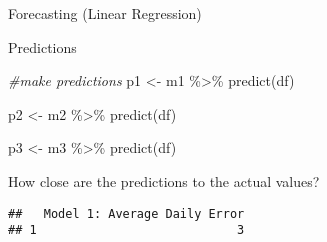 \documentclass[
  ignorenonframetext,
]{beamer}
\newenvironment{Shaded}{\begin{snugshade}}{\end{snugshade}}
\newcommand{\AttributeTok}[1]{\textcolor[rgb]{0.77,0.63,0.00}{#1}}
\newcommand{\CommentTok}[1]{\textcolor[rgb]{0.56,0.35,0.01}{\textit{#1}}}
\newcommand{\FunctionTok}[1]{\textcolor[rgb]{0.00,0.00,0.00}{#1}}
\newcommand{\NormalTok}[1]{#1}
\newcommand{\OtherTok}[1]{\textcolor[rgb]{0.56,0.35,0.01}{#1}}
\newcommand{\SpecialCharTok}[1]{\textcolor[rgb]{0.00,0.00,0.00}{#1}}
\newcommand{\StringTok}[1]{\textcolor[rgb]{0.31,0.60,0.02}{#1}}
\begin{document}
\begin{frame}[fragile]{Forecasting (Linear Regression)}
\begin{block}{Predictions}
\protect\hypertarget{predictions}{}
\begin{Shaded}
\begin{Highlighting}[]
\CommentTok{\#make predictions}
\NormalTok{p1 }\OtherTok{\textless{}{-}}\NormalTok{ m1 }\SpecialCharTok{\%\textgreater{}\%} 
  \FunctionTok{predict}\NormalTok{(df)}

\NormalTok{p2 }\OtherTok{\textless{}{-}}\NormalTok{ m2 }\SpecialCharTok{\%\textgreater{}\%} 
  \FunctionTok{predict}\NormalTok{(df)}

\NormalTok{p3 }\OtherTok{\textless{}{-}}\NormalTok{ m3 }\SpecialCharTok{\%\textgreater{}\%} 
  \FunctionTok{predict}\NormalTok{(df)}
\end{Highlighting}
\end{Shaded}
\end{block}

\begin{block}{How close are the predictions to the actual values?}
\protect\hypertarget{how-close-are-the-predictions-to-the-actual-values}{}
\begin{Shaded}
\end{Shaded}

\begin{verbatim}
##   Model 1: Average Daily Error
## 1                            3
\end{verbatim}


\end{block}
\end{frame}
\end{document}

